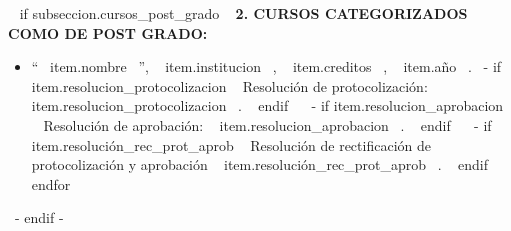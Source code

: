     ~{ if subseccion.cursos_post_grado }~
      \textbf{2. CURSOS CATEGORIZADOS COMO DE POST GRADO:}
      \begin{itemize}
      ~{ for item in subseccion.cursos_post_grado }~
        \item ``~{{ item.nombre }}~'', ~{{ item.institucion }}~, ~{{ item.creditos }}~, ~{{ item.año }}~.
              ~{- if item.resolucion_protocolizacion }~ Resolución de protocolización: ~{{ item.resolucion_protocolizacion }}~. ~{ endif }~
              ~{- if item.resolucion_aprobacion }~ Resolución de aprobación: ~{{ item.resolucion_aprobacion }}~. ~{ endif }~
              ~{- if item.resolución_rec_prot_aprob }~ Resolución de rectificación de protocolización y aprobación ~{{ item.resolución_rec_prot_aprob }}~. ~{ endif }~
        \espacioEntreItems{}
      ~{ endfor }~
      \end{itemize}
      \espacioEntreSubSecciones{}
    ~{- endif -}~

